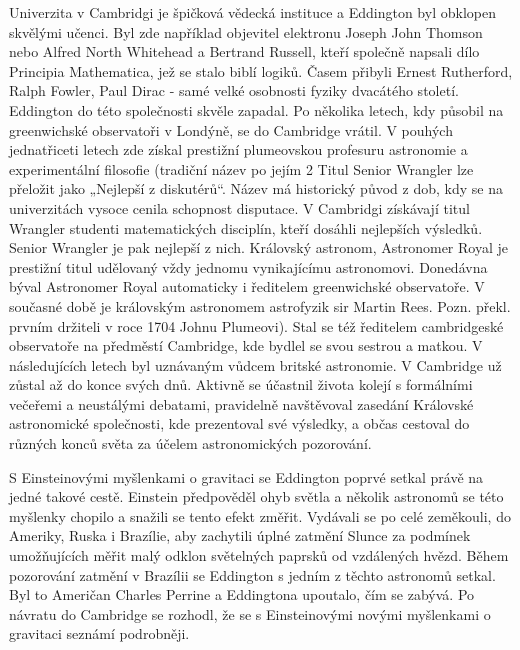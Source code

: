  Univerzita v Cambridgi je špičková vědecká instituce a Eddington byl obklopen skvělými učenci. Byl
  zde například objevitel elektronu Joseph John Thomson nebo Alfred North Whitehead a Bertrand
  Russell, kteří společně napsali dílo Principia Mathematica, jež se stalo biblí logiků. Časem
  přibyli Ernest Rutherford, Ralph Fowler, Paul Dirac - samé velké osobnosti fyziky dvacátého
  století. Eddington do této společnosti skvěle zapadal. Po několika letech, kdy působil na
  greenwichské observatoři v Londýně, se do Cambridge vrátil. V pouhých jednatřiceti letech zde
  získal prestižní plumeovskou profesuru astronomie a experimentální filosofie (tradiční název po
  jejím 2 Titul Senior Wrangler lze přeložit jako „Nejlepší z diskutérů“. Název má historický původ
  z dob, kdy se na univerzitách vysoce cenila schopnost disputace. V Cambridgi získávají titul
  Wrangler studenti matematických disciplín, kteří dosáhli nejlepších výsledků. Senior Wrangler je
  pak nejlepší z nich. Královský astronom, Astronomer Royal je prestižní titul udělovaný vždy
  jednomu vynikajícímu astronomovi. Donedávna býval Astronomer Royal automaticky i ředitelem
  greenwichské observatoře. V současné době je královským astronomem astrofyzik sir Martin Rees.
  Pozn. překl. prvním držiteli v roce 1704 Johnu Plumeovi). Stal se též ředitelem cambridgeské
  observatoře na předměstí Cambridge, kde bydlel se svou sestrou a matkou. V následujících letech
  byl uznávaným vůdcem britské astronomie. V Cambridge už zůstal až do konce svých dnů. Aktivně se
  účastnil života kolejí s formálními večeřemi a neustálými debatami, pravidelně navštěvoval
  zasedání Královské astronomické společnosti, kde prezentoval své výsledky, a občas cestoval do
  různých konců světa za účelem astronomických pozorování. 
  
  S Einsteinovými myšlenkami o gravitaci se Eddington poprvé setkal právě na jedné takové cestě.
  Einstein předpověděl ohyb světla a několik astronomů se této myšlenky chopilo a snažili se tento
  efekt změřit. Vydávali se po celé zeměkouli, do Ameriky, Ruska i Brazílie, aby zachytili úplné
  zatmění Slunce za podmínek umožňujících měřit malý odklon světelných paprsků od vzdálených hvězd.
  Během pozorování zatmění v Brazílii se Eddington s jedním z těchto astronomů setkal. Byl to
  Američan Charles Perrine a Eddingtona upoutalo, čím se zabývá. Po návratu do Cambridge se rozhodl,
  že se s Einsteinovými novými myšlenkami o gravitaci seznámí podrobněji. 
  
